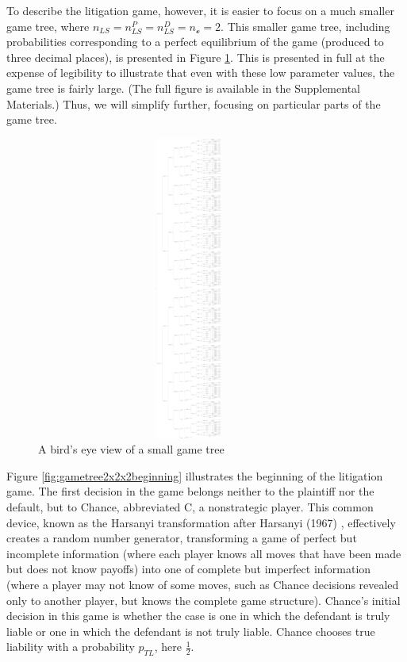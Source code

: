 \documentclass{article}
\begin{document}
To describe the litigation game, however, it is easier to focus on a much smaller game tree, where $n_{LS}=n_{LS}^P=n_{LS}^D=n_{\mathcal{o}}=2$. This smaller game tree, including probabilities corresponding to a perfect equilibrium of the game (produced to three decimal places), is presented in Figure \ref{fig:gametree2x2x2}. This is presented in full at the expense of legibility to illustrate that even with these low parameter values, the game tree is fairly large. (The full figure is available in the Supplemental Materials.) Thus, we will simplify further, focusing on particular parts of the game tree.
\begin{figure}[h!]
\centering
\includegraphics[width=10cm, height=10cm, trim={0in 0in 0in 0in}, clip]{../Figures/game tree 2x2x2.pdf}
\caption{A bird's eye view of a small game tree}
\label{fig:gametree2x2x2}
\end{figure}

Figure \ref{fig:gametree2x2x2beginning} illustrates the beginning of the litigation game. The first decision in the game belongs neither to the plaintiff nor the default, but to Chance, abbreviated C, a nonstrategic player. This common device, known as the Harsanyi transformation after Harsanyi (1967) \cite{harsanyi}, effectively creates a random number generator, transforming a game of perfect but incomplete information (where each player knows all moves that have been made but does not know payoffs) into one of complete but imperfect information (where a player may not know of some moves, such as Chance decisions revealed only to another player, but knows the complete game structure). Chance's initial decision in this game is whether the case is one in which the defendant is truly liable or one in which the defendant is not truly liable. Chance chooses true liability with a probability $p_{TL}$, here $\frac{1}{2}$. 
\end{document}
